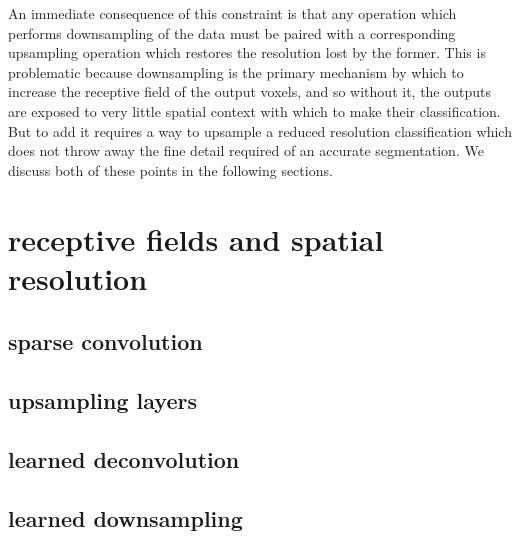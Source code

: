 \documentclass[msc]{infthesis}
\begin{document}
An immediate consequence of this constraint is that any operation which performs downsampling
of the data must be paired with a corresponding upsampling operation which restores the
resolution lost by the former.  This is problematic because downsampling is the primary
mechanism by which to increase the receptive field of the output voxels, and so without it,
the outputs are exposed to very little spatial context with which to make their classification.
But to add it requires a way to upsample a reduced resolution classification which does not
throw away the fine detail required of an accurate segmentation.  We discuss both of these
points in the following sections.






\section{receptive fields and spatial resolution}
\label{sec:segmentation-3}


\subsection{sparse convolution}
\label{sec:segmentation-3-1}


\subsection{upsampling layers}
\label{sec:segmentation-3-2}


\subsection{learned deconvolution}
\label{sec:segmentation-3-3}


\subsection{learned downsampling}
\label{sec:segmentation-3-4}
\end{document}
